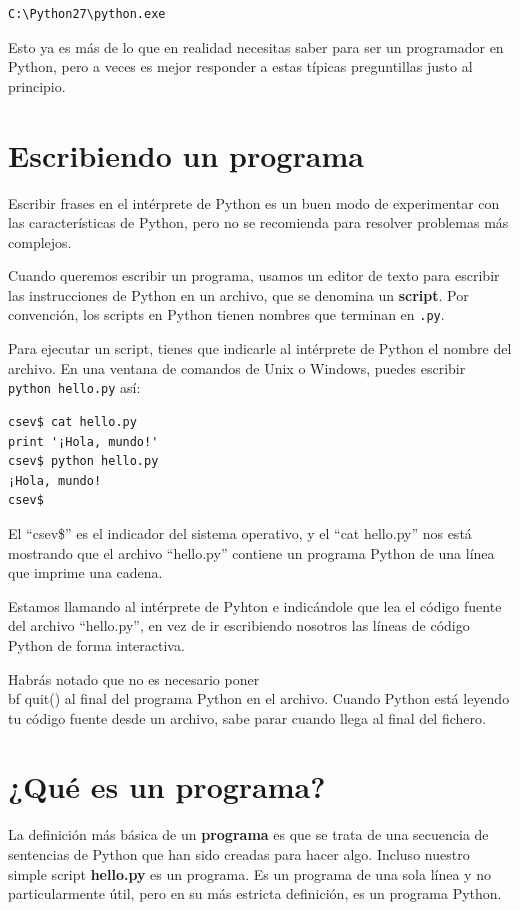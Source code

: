 \beforeverb
\begin{verbatim}
C:\Python27\python.exe
\end{verbatim}
\afterverb
%
Esto ya es más de lo que en realidad necesitas saber para ser un programador en Python,
pero a veces es mejor responder a estas típicas preguntillas justo
al principio.

\section{Escribiendo un programa}

Escribir frases en el intérprete de Python es un buen modo de experimentar
con las características de Python, pero no se recomienda para resolver problemas
más complejos.

Cuando queremos escribir un programa,
usamos un editor de texto para escribir las instrucciones de Python en un archivo,
que se denomina un {\bf script}. Por
convención, los scripts en Python tienen nombres que terminan en {\tt .py}.


Para ejecutar un script, tienes que indicarle al intérprete de Python
el nombre del archivo. En una ventana de comandos de Unix o Windows,
puedes escribir {\tt python hello.py} así:

\beforeverb
\begin{verbatim}
csev$ cat hello.py
print '¡Hola, mundo!'
csev$ python hello.py
¡Hola, mundo!
csev$
\end{verbatim}
\afterverb
%
El ``csev\$'' es el indicador del sistema operativo, y el ``cat hello.py'' nos
está mostrando que el archivo ``hello.py'' contiene un programa Python de una línea
que imprime una cadena.

Estamos llamando al intérprete de Pyhton e indicándole que lea el código fuente del
archivo ``hello.py'', en vez de ir escribiendo nosotros las líneas de código Python
de forma interactiva.

Habrás notado que no es necesario poner {\\bf quit()} al final del programa
Python en el archivo. Cuando Python está leyendo tu código fuente
desde un archivo, sabe parar cuando llega al final del fichero.

\section{¿Qué es un programa?}

La definición más básica de un {\bf programa} es que se trata de una
secuencia de sentencias de Python que han sido creadas para hacer algo.
Incluso nuestro simple script {\bf hello.py} es un programa. Es un programa
de una sola línea y no particularmente útil, pero en su más estricta definición,
es un programa Python. 

